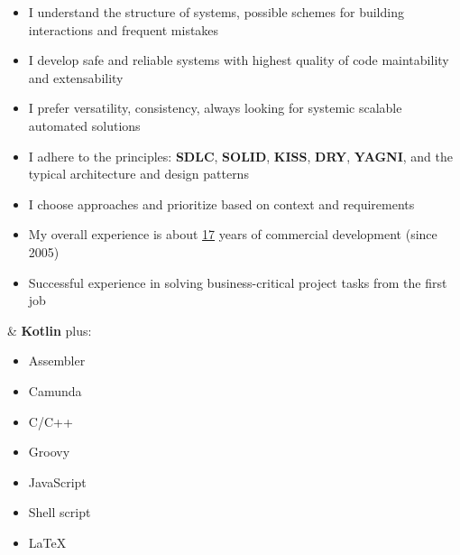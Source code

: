     \begin{minipage}[t]{0.76\textwidth} %
        \vspace{-\baselineskip} %
        

        \begin{itemize}[leftmargin=.0in]
        	\setlength\itemsep{0em}
            \item I understand the structure of systems, possible schemes for building interactions and frequent mistakes
            \item I develop safe and reliable systems with highest quality of code maintability and extensability
            \item I prefer versatility, consistency, always looking for systemic scalable automated solutions
            \item I adhere to the principles: \textbf{SDLC}, \textbf{SOLID}, \textbf{KISS}, \textbf{DRY}, \textbf{YAGNI}, and the typical architecture and design patterns
            \item I choose approaches and prioritize based on context and requirements
            \item My overall experience is about \underline{17} years of commercial development (since 2005)
            \item Successful experience in solving business-critical project tasks from the first job
        \end{itemize}

    \end{minipage}
    \hfill %
    \begin{minipage}[t]{0.20\textwidth} %
        \vspace{-\baselineskip}
        
        
         \& \textbf{Kotlin} plus:
        \begin{itemize}[leftmargin=.2in]
        	\setlength\itemsep{0em}
        	\item Assembler
        	\item Camunda
        	\item C/C++
           	\item Groovy
           	\item JavaScript
           	\item Shell script
            
            
            \item \LaTeX
        \end{itemize}
    \end{minipage}

\vspace{0.4cm}